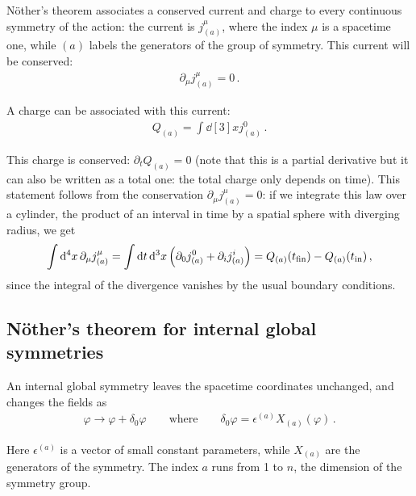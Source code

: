 \documentclass[main.tex]{subfiles}
\begin{document}
Nöther's theorem associates a conserved current and charge to every continuous symmetry of the action: the current is \(j^{\mu }_{(a)}\), where the index \(\mu \) is a spacetime one, while \((a)\) labels the generators of the group of symmetry. This current will be conserved: 
%
\begin{align}
\partial_{\mu } j^{\mu }_{(a)} = 0
\,.
\end{align}

A charge can be associated with this current: 
%
\begin{align}
Q_{(a)} = \int \dd[3]{x} j^{0}_{(a)}
\,.
\end{align}

This charge is conserved: \(\partial_{t} Q_{(a)} =0 \) (note that this is a partial derivative but it can also be written as a total one: the total charge only depends on time). This statement follows from the conservation \(\partial_{\mu } j^{\mu }_{(a)} =0 \): if we integrate this law over a cylinder, the product of an interval in time by a spatial sphere with diverging radius, we get 
%
\begin{align}
\int \dd[4]{x} \partial_{\mu } j^{\mu }_{(a)} = \int \dd{t} \dd[3]{x} \qty(\partial_{0} j^{0}_{(a)} + \partial_{i}j^{i}_{(a)}) = Q_{(a)}(t _{\text{fin}}) - Q_{(a)} (t _{\text{in}})
\,,
\end{align}
%
since the integral of the divergence vanishes by the usual boundary conditions. 

\subsection{Nöther's theorem for internal global symmetries}

An internal global symmetry leaves the spacetime coordinates unchanged, and changes the fields as 
%
\begin{align}
\varphi \to \varphi + \delta_0 \varphi 
\qquad \text{where} \qquad
\delta_0 \varphi = \epsilon^{(a)} X_{(a)}(\varphi )
\,.
\end{align}

Here \(\epsilon^{(a)}\) is a vector of small constant parameters, while \(X_{(a)}\) are the generators of the symmetry. 
The index \(a\) runs from 1 to \(n\), the dimension of the symmetry group. 
\end{document}
